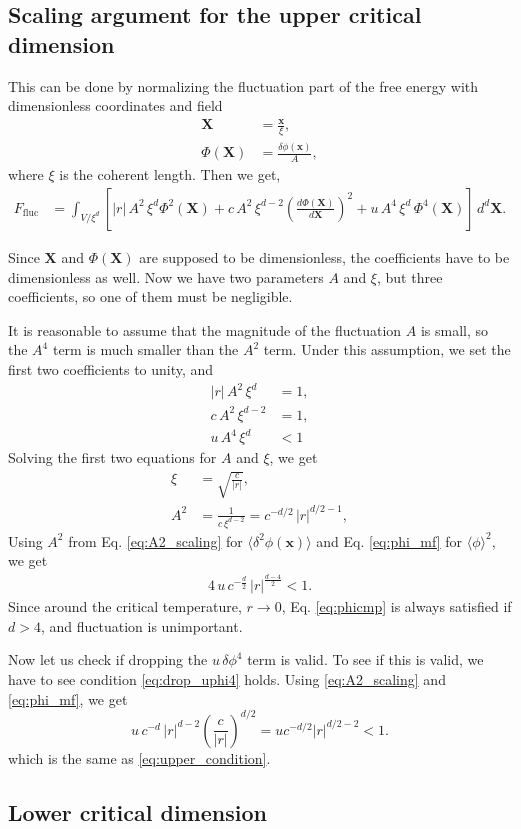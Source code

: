 \documentclass{article}
\begin{document}
\subsection{Scaling argument for the upper critical dimension}

This can be done by normalizing the fluctuation part of the free energy with dimensionless coordinates and field
\begin{align}
\mathbf X &= \frac{ \mathbf x }{ \xi }, \\
\Phi(\mathbf X) &= \frac{ \delta \phi(\mathbf x) }{A},
\end{align}
where $\xi$ is the coherent length.
%
Then we get,
$$
\begin{aligned}
F_\mathrm{fluc}
&=
\int_{V/\xi^d} \left[
|r| \, A^2\, \xi^d \Phi^2(\mathbf X)
+ c \, A^2 \, \xi^{d-2} \left(
\frac{ d \Phi(\mathbf X) }{ d \mathbf X} \right)^2
+ u \, A^4 \, \xi^d \, \Phi^4(\mathbf X)
\right] \, d^d \mathbf X.
\end{aligned}
$$

Since $\mathbf X$ and $\Phi(\mathbf X)$ are supposed to be dimensionless,
the coefficients have to be dimensionless as well.
Now we have two parameters $A$ and $\xi$,
but three coefficients, so one of them must be negligible.

It is reasonable to assume that
the magnitude of the fluctuation $A$ is small,
so the $A^4$ term is much smaller than the $A^2$ term.
Under this assumption,
we set the first two coefficients to unity, and
\begin{align}
|r| \, A^2 \, \xi^d &= 1, \\
c \, A^2 \, \xi^{d-2} &= 1, \\
u \, A^4 \, \xi^d &< 1
\label{eq:drop_uphi4}
\end{align}
Solving the first two equations for $A$ and $\xi$, we get
\begin{align}
\xi &= \sqrt{\frac{c}{|r|}},
\label{eq:xi_scaling}
\\
A^2 &= \frac{1}{c \, \xi^{d-2}} = c^{-d/2} \, |r|^{d/2-1},
\label{eq:A2_scaling}
\end{align}
Using $A^2$ from Eq. \eqref{eq:A2_scaling} for $\langle \delta^2 \phi(\mathbf x) \rangle$
and Eq. \eqref{eq:phi_mf} for $\langle \phi \rangle^2$, we get
\begin{align}
4 \, u \, c^{-\frac{d}{2}} \, |r|^{\frac{d-4}{2}} < 1.
\label{eq:upper_condition}
\end{align}
Since around the critical temperature, $r \rightarrow 0$,
Eq. \eqref{eq:phicmp} is always satisfied if $d > 4$,
and fluctuation is unimportant.



Now let us check if dropping the $u \, \delta\phi^4$ term is valid.
To see if this is valid,
we have to see condition \eqref{eq:drop_uphi4} holds.
Using \eqref{eq:A2_scaling} and \eqref{eq:phi_mf}, we get
$$
u \, c^{-d} \, |r|^{d - 2}
\left( \frac{c}{|r|} \right)^{d/2}
=
u c^{-d/2} |r|^{d/2 - 2}
< 1.
$$
which is the same as \eqref{eq:upper_condition}.


\subsection{Lower critical dimension}
\end{document}
